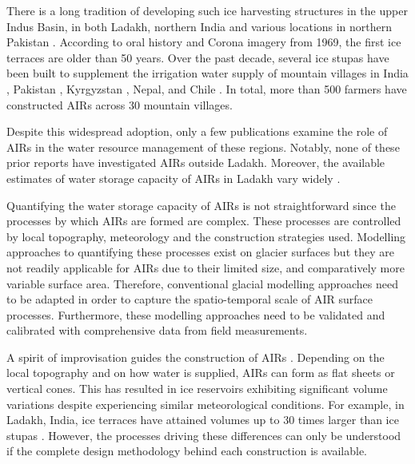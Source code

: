 There is a long tradition of developing such ice harvesting structures in the upper Indus Basin, in both Ladakh,
northern India \citep{labbalTraditionalOasesLadakh2000, nusserIrrigationDevelopmentUpper2012} and various
locations in northern Pakistan \citep{kreutzmannScarcityOpulenceWater2011}. According to oral history and Corona
imagery from 1969, the first ice terraces are older than 50 years. Over the past decade, several ice stupas have
been built to supplement the irrigation water supply of mountain villages in India
\citep{wangchukIceStupaCompetition2020, palmerStoringFrozenWater2022, aggarwalAdaptationClimateChange2021},
Pakistan \citep{awazproductionIceStupaArtificial2022}, Kyrgyzstan \citep{bbcnewsBrightArtificialGlacier2020},
Nepal, and Chile \citep{reutersConservationistsChileAim2021}. In total, more than 500 farmers have constructed AIRs across 30 mountain villages.

Despite this widespread adoption, only a few publications examine the role of \ac{AIRs} in the water resource
management of these regions. Notably, none of these prior reports have investigated \ac{AIRs} outside Ladakh.
Moreover, the available estimates of water storage capacity of \ac{AIRs} in Ladakh vary widely
\citep{norphelSnowWaterHarvesting2015, baglaArtificialGlaciersHelp1998}.

Quantifying the water storage capacity of \ac{AIRs} is not straightforward since the processes by which \ac{AIRs} are
formed are complex. These processes are controlled by local topography, meteorology and the construction
strategies used. Modelling approaches to quantifying these processes exist on glacier surfaces but they are not
readily applicable for \ac{AIRs} due to their limited size, and comparatively more variable surface area. Therefore,
conventional glacial modelling approaches need to be adapted in order to capture the
spatio-temporal scale of AIR surface processes. Furthermore, these modelling approaches need to be validated and
calibrated with comprehensive data from field measurements. 

A spirit of improvisation guides the construction of \ac{AIRs} \citep{clouseLadakhArtificialGlaciers2017}.
Depending on the local topography and on how water is supplied, \ac{AIRs} can form as flat sheets
or vertical cones. This has resulted in ice reservoirs exhibiting significant volume variations despite
experiencing similar meteorological conditions. For example, in Ladakh, India, ice terraces have attained volumes up to 30 times
larger than ice stupas \citep{nusserSociohydrologyArtificialGlaciers2019}. However, the
processes driving these differences can only be understood if the complete design methodology behind each construction is available.

